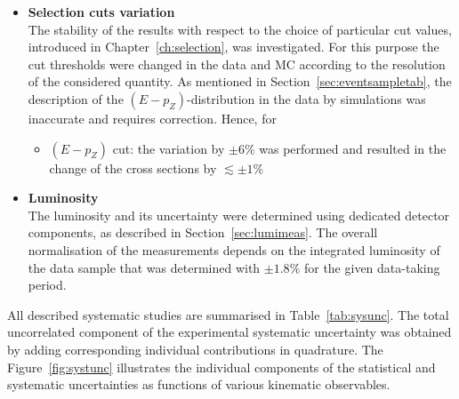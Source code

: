 \begin{itemize}
	\item \textbf{Selection cuts variation} \\
		The stability of the results with respect to the choice of particular cut values, introduced in Chapter~\ref{ch:selection}, was investigated. For this purpose the cut thresholds were changed in the data and MC according to the resolution of the considered quantity. As mentioned in Section~\ref{sec:eventsampletab}, the description of the $\left(E-p_Z\right)$-distribution in the data by simulations was inaccurate and requires correction. Hence, for 
		\begin{itemize}
			\item $\left( E-p_Z\right) $ cut: the variation by $\pm6\%$ was performed and resulted in the change of the cross sections by $\lesssim \pm 1\%$
		\end{itemize}
	\item \textbf{Luminosity} \\
		The luminosity and its uncertainty were determined using dedicated detector components, as described in Section~\ref{sec:lumimeas}. The overall normalisation of the measurements depends on the integrated luminosity of the data sample that was determined with $\pm1.8\%$ for the given data-taking period.
\end{itemize}
All described systematic studies are summarised in Table~\ref{tab:sysunc}. The total uncorrelated component of the experimental systematic uncertainty was obtained by adding corresponding individual contributions in quadrature. The Figure~\ref{fig:systunc} illustrates the individual components of the statistical and systematic uncertainties as functions of various kinematic observables.
